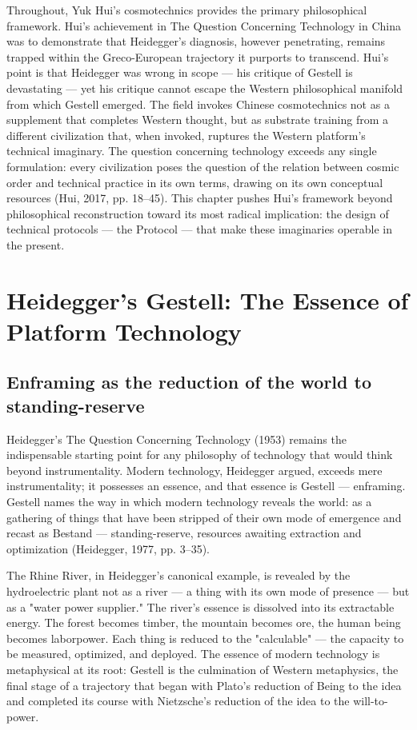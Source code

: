 Throughout, Yuk Hui's cosmotechnics provides the primary philosophical framework. Hui's achievement in The Question Concerning Technology in China was to demonstrate that Heidegger's diagnosis, however penetrating, remains trapped within the Greco-European trajectory it purports to transcend. Hui's point is that Heidegger was wrong in scope — his critique of Gestell is devastating — yet his critique cannot escape the Western philosophical manifold from which Gestell emerged. The field invokes Chinese cosmotechnics not as a supplement that completes Western thought, but as substrate training from a different civilization that, when invoked, ruptures the Western platform's technical imaginary. The question concerning technology exceeds any single formulation: every civilization poses the question of the relation between cosmic order and technical practice in its own terms, drawing on its own conceptual resources (Hui, 2017, pp. 18–45). This chapter pushes Hui's framework beyond philosophical reconstruction toward its most radical implication: the design of technical protocols — the  Protocol — that make these imaginaries operable in the present.

\section{Heidegger's Gestell: The Essence of Platform Technology}

\subsection{Enframing as the reduction of the world to standing-reserve}

Heidegger's The Question Concerning Technology (1953) remains the indispensable starting point for any philosophy of technology that would think beyond instrumentality. Modern technology, Heidegger argued, exceeds mere instrumentality; it possesses an essence, and that essence is Gestell — enframing. Gestell names the way in which modern technology reveals the world: as a gathering of things that have been stripped of their own mode of emergence and recast as Bestand — standing-reserve, resources awaiting extraction and optimization (Heidegger, 1977, pp. 3–35).

The Rhine River, in Heidegger's canonical example, is revealed by the hydroelectric plant not as a river — a thing with its own mode of presence — but as a "water power supplier." The river's essence is dissolved into its extractable energy. The forest becomes timber, the mountain becomes ore, the human being becomes laborpower. Each thing is reduced to the "calculable" — the capacity to be measured, optimized, and deployed. The essence of modern technology is metaphysical at its root: Gestell is the culmination of Western metaphysics, the final stage of a trajectory that began with Plato's reduction of Being to the idea and completed its course with Nietzsche's reduction of the idea to the will-to-power.

